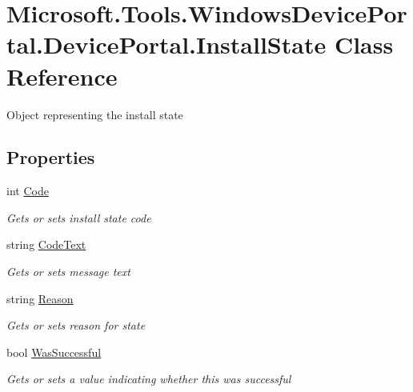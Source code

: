 \hypertarget{class_microsoft_1_1_tools_1_1_windows_device_portal_1_1_device_portal_1_1_install_state}{}\section{Microsoft.\+Tools.\+Windows\+Device\+Portal.\+Device\+Portal.\+Install\+State Class Reference}
\label{class_microsoft_1_1_tools_1_1_windows_device_portal_1_1_device_portal_1_1_install_state}


Object representing the install state  


\subsection*{Properties}
\begin{DoxyCompactItemize}
\item 
int \hyperlink{class_microsoft_1_1_tools_1_1_windows_device_portal_1_1_device_portal_1_1_install_state_a7e1623428f63f422374096a9677c8c7d}{Code}
\begin{DoxyCompactList}\small\item\em Gets or sets install state code \end{DoxyCompactList}\item 
string \hyperlink{class_microsoft_1_1_tools_1_1_windows_device_portal_1_1_device_portal_1_1_install_state_a5af3654a792bac30cfe641b7f604bf62}{Code\+Text}
\begin{DoxyCompactList}\small\item\em Gets or sets message text \end{DoxyCompactList}\item 
string \hyperlink{class_microsoft_1_1_tools_1_1_windows_device_portal_1_1_device_portal_1_1_install_state_ab782a8f83700ec79820482a7b8f3f910}{Reason}
\begin{DoxyCompactList}\small\item\em Gets or sets reason for state \end{DoxyCompactList}\item 
bool \hyperlink{class_microsoft_1_1_tools_1_1_windows_device_portal_1_1_device_portal_1_1_install_state_a80a5eebd7063f999e188aeda1ef35e81}{Was\+Successful}
\begin{DoxyCompactList}\small\item\em Gets or sets a value indicating whether this was successful \end{DoxyCompactList}\end{DoxyCompactItemize}


